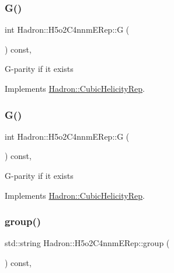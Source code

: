 \subsubsection{\texorpdfstring{G()}{G()}\hspace{0.1cm}{\footnotesize\ttfamily [2/3]}}
{\footnotesize\ttfamily int Hadron\+::\+H5o2\+C4nnm\+E\+Rep\+::G (\begin{DoxyParamCaption}{ }\end{DoxyParamCaption}) const\hspace{0.3cm}{\ttfamily [inline]}, {\ttfamily [virtual]}}

G-\/parity if it exists 

Implements \mbox{\hyperlink{structHadron_1_1CubicHelicityRep_a50689f42be1e6170aa8cf6ad0597018b}{Hadron\+::\+Cubic\+Helicity\+Rep}}.

\mbox{\label{structHadron_1_1H5o2C4nnmERep_a4bfc67bc8a4c5f245f5e2917a2eaf51e}} 
\subsubsection{\texorpdfstring{G()}{G()}\hspace{0.1cm}{\footnotesize\ttfamily [3/3]}}
{\footnotesize\ttfamily int Hadron\+::\+H5o2\+C4nnm\+E\+Rep\+::G (\begin{DoxyParamCaption}{ }\end{DoxyParamCaption}) const\hspace{0.3cm}{\ttfamily [inline]}, {\ttfamily [virtual]}}

G-\/parity if it exists 

Implements \mbox{\hyperlink{structHadron_1_1CubicHelicityRep_a50689f42be1e6170aa8cf6ad0597018b}{Hadron\+::\+Cubic\+Helicity\+Rep}}.

\mbox{\label{structHadron_1_1H5o2C4nnmERep_aa8513a91bb6679841b0cae22000013c0}} 
\subsubsection{\texorpdfstring{group()}{group()}\hspace{0.1cm}{\footnotesize\ttfamily [1/3]}}
{\footnotesize\ttfamily std\+::string Hadron\+::\+H5o2\+C4nnm\+E\+Rep\+::group (\begin{DoxyParamCaption}{ }\end{DoxyParamCaption}) const\hspace{0.3cm}{\ttfamily [inline]}, {\ttfamily [virtual]}}

